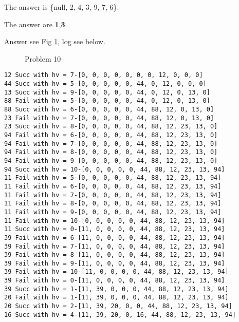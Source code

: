 \documentclass[11pt,largemargins]{homework}
\begin{document}
\newpage
\question
The answer is \{null, 2, 4, 3, 9, 7, 6\}.

\question
The answer are \textbf{1},\textbf{3}.

\question
Answer see Fig \ref{hs10}, log see below.

\begin{figure}[h!]
\centering
{}
\caption{Problem 10}
\label{hs10}
\end{figure}

\begin{lstlisting}
12 Succ with hv = 7-[0, 0, 0, 0, 0, 0, 0, 12, 0, 0, 0]
44 Succ with hv = 5-[0, 0, 0, 0, 0, 44, 0, 12, 0, 0, 0]
13 Succ with hv = 9-[0, 0, 0, 0, 0, 44, 0, 12, 0, 13, 0]
88 Fail with hv = 5-[0, 0, 0, 0, 0, 44, 0, 12, 0, 13, 0]
88 Succ with hv = 6-[0, 0, 0, 0, 0, 44, 88, 12, 0, 13, 0]
23 Fail with hv = 7-[0, 0, 0, 0, 0, 44, 88, 12, 0, 13, 0]
23 Succ with hv = 8-[0, 0, 0, 0, 0, 44, 88, 12, 23, 13, 0]
94 Fail with hv = 6-[0, 0, 0, 0, 0, 44, 88, 12, 23, 13, 0]
94 Fail with hv = 7-[0, 0, 0, 0, 0, 44, 88, 12, 23, 13, 0]
94 Fail with hv = 8-[0, 0, 0, 0, 0, 44, 88, 12, 23, 13, 0]
94 Fail with hv = 9-[0, 0, 0, 0, 0, 44, 88, 12, 23, 13, 0]
94 Succ with hv = 10-[0, 0, 0, 0, 0, 44, 88, 12, 23, 13, 94]
11 Fail with hv = 5-[0, 0, 0, 0, 0, 44, 88, 12, 23, 13, 94]
11 Fail with hv = 6-[0, 0, 0, 0, 0, 44, 88, 12, 23, 13, 94]
11 Fail with hv = 7-[0, 0, 0, 0, 0, 44, 88, 12, 23, 13, 94]
11 Fail with hv = 8-[0, 0, 0, 0, 0, 44, 88, 12, 23, 13, 94]
11 Fail with hv = 9-[0, 0, 0, 0, 0, 44, 88, 12, 23, 13, 94]
11 Fail with hv = 10-[0, 0, 0, 0, 0, 44, 88, 12, 23, 13, 94]
11 Succ with hv = 0-[11, 0, 0, 0, 0, 44, 88, 12, 23, 13, 94]
39 Fail with hv = 6-[11, 0, 0, 0, 0, 44, 88, 12, 23, 13, 94]
39 Fail with hv = 7-[11, 0, 0, 0, 0, 44, 88, 12, 23, 13, 94]
39 Fail with hv = 8-[11, 0, 0, 0, 0, 44, 88, 12, 23, 13, 94]
39 Fail with hv = 9-[11, 0, 0, 0, 0, 44, 88, 12, 23, 13, 94]
39 Fail with hv = 10-[11, 0, 0, 0, 0, 44, 88, 12, 23, 13, 94]
39 Fail with hv = 0-[11, 0, 0, 0, 0, 44, 88, 12, 23, 13, 94]
39 Succ with hv = 1-[11, 39, 0, 0, 0, 44, 88, 12, 23, 13, 94]
20 Fail with hv = 1-[11, 39, 0, 0, 0, 44, 88, 12, 23, 13, 94]
20 Succ with hv = 2-[11, 39, 20, 0, 0, 44, 88, 12, 23, 13, 94]
16 Succ with hv = 4-[11, 39, 20, 0, 16, 44, 88, 12, 23, 13, 94]
\end{lstlisting}
\end{document}
